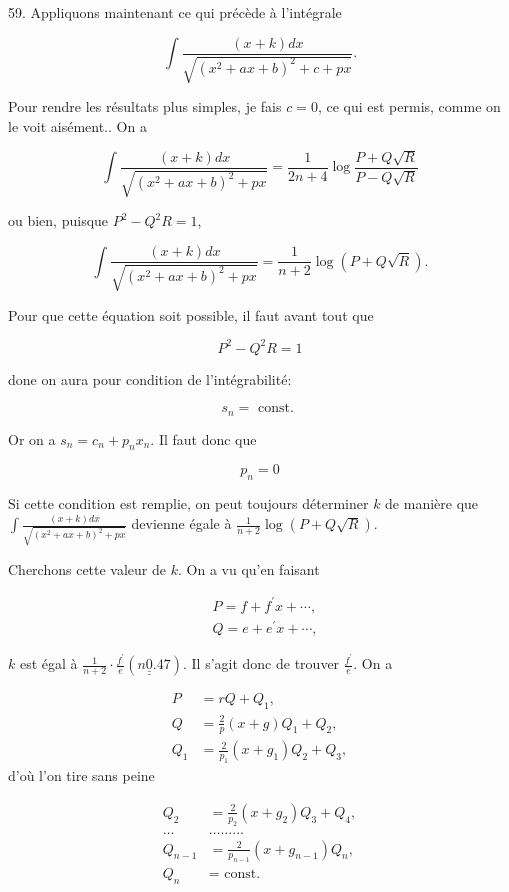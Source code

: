 \documentclass{article}
\begin{document}
59. Appliquons maintenant ce qui précède à l'intégrale

\[
\int \frac{(x+k) d x}{\sqrt{\left(x^{2}+a x+b\right)^{2}+c+p x}} .
\]

Pour rendre les résultats plus simples, je fais \(c=0\), ce qui est permis, comme on le voit aisément.. On a

\[
\int \frac{(x+k) d x}{\sqrt{\left(x^{2}+a x+b\right)^{2}+p x}}=\frac{1}{2 n+4} \log \frac{P+Q \sqrt{R}}{P-Q \sqrt{R}}
\]

ou bien, puisque \(P^{2}-Q^{2} R=1\),

\[
\int \frac{(x+k) d x}{\sqrt{\left(x^{2}+a x+b\right)^{2}+p x}}=\frac{1}{n+2} \log (P+Q \sqrt{R}) .
\]

Pour que cette équation soit possible, il faut avant tout que

\[
P^{2}-Q^{2} R=1
\]

done on aura pour condition de l'intégrabilité:

\[
s_{n}=\text { const. }
\]

Or on a \(s_{n}=c_{n}+p_{n} x_{n}\). Il faut donc que

\[
p_{n}=0
\]

\(\mathrm{Si}\) cette condition est remplie, on peut toujours déterminer \(k\) de manière que \(\int \frac{(x+k) d x}{\sqrt{\left(x^{2}+a x+b\right)^{2}+p x}}\) devienne égale à \(\frac{1}{n+2} \log (P+Q \sqrt{R})\).

Cherchons cette valeur de \(k\). On a vu qu'en faisant

\[
\begin{aligned}
& P=f+f^{\prime} x+\cdots, \\
& Q=e+e^{\prime} x+\cdots,
\end{aligned}
\]

\(k\) est égal à \(\frac{1}{n+2} \cdot \frac{f^{\prime}}{e}(n \underline{\underline{0}} .47)\). Il s'agit donc de trouver \(\frac{f^{\prime}}{e}\). On a

\[
\begin{aligned}
P & =r Q+Q_{1}, \\
Q & =\frac{2}{p}(x+g) Q_{1}+Q_{2}, \\
Q_{1} & =\frac{2}{p_{1}}\left(x+g_{1}\right) Q_{2}+Q_{3},
\end{aligned}
\]
d'où l'on tire sans peine

\[
\begin{aligned}
Q_{2} & =\frac{2}{p_{2}}\left(x+g_{2}\right) Q_{3}+Q_{4}, \\
\ldots & \ldots \ldots \ldots \\
Q_{n-1} & =\frac{2}{p_{n-1}}\left(x+g_{n-1}\right) Q_{n}, \\
Q_{n} & =\text { const. }
\end{aligned}
\]
\end{document}
